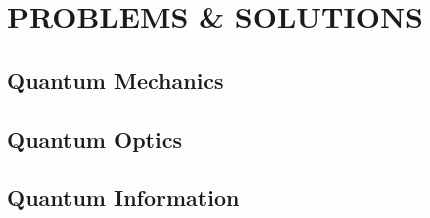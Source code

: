 \documentclass{book}
\theoremstyle{definition}
\begin{document}
\chapter{PROBLEMS \& SOLUTIONS}

\newpage

\section{Quantum Mechanics}

\newpage

\section{Quantum Optics}

\newpage

\section{Quantum Information}



\newpage
\end{document}
